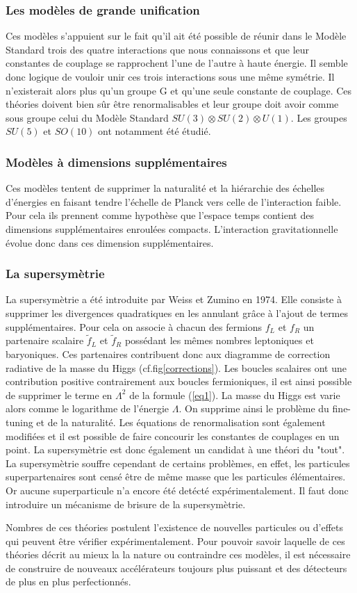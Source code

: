 \subsubsection{Les modèles de grande unification}
Ces modèles s'appuient sur le fait qu'il ait été possible de réunir dans le Modèle Standard trois des quatre interactions que nous connaissons et que leur constantes de couplage se rapprochent l'une de l'autre à haute énergie. Il semble donc logique de vouloir unir ces trois interactions sous une même symétrie. Il n'existerait alors plus qu'un groupe G et qu'une seule constante de couplage. Ces théories doivent bien sûr être renormalisables et leur groupe doit avoir comme sous groupe celui du Modèle Standard $SU(3)\otimes SU(2) \otimes U(1)$. Les groupes $SU(5)$ et $SO(10)$ ont notamment été étudié.

\subsubsection{Modèles à dimensions supplémentaires}
Ces modèles tentent de supprimer la naturalité et la hiérarchie des échelles d'énergies en faisant tendre l'échelle de Planck vers celle de l'interaction faible. Pour cela ils prennent comme hypothèse que l'espace temps contient des dimensions supplémentaires enroulées compacts. L'interaction gravitationnelle évolue donc dans ces dimension supplémentaires.

\subsubsection{La supersymètrie}
La supersymètrie a été introduite par Weiss et Zumino en 1974. Elle consiste à supprimer les divergences quadratiques  en les annulant grâce à l'ajout de termes supplémentaires. Pour cela on associe à chacun des fermions $f_{L}$ et $f_{R}$ un partenaire scalaire $\tilde{f}_{L}$ et $\tilde{f}_{R}$ possédant les mêmes nombres leptoniques et baryoniques. Ces partenaires contribuent donc aux diagramme de correction radiative de la masse du Higgs (cf.fig\ref{corrections}). Les boucles scalaires ont une contribution positive contrairement aux boucles fermioniques, il est ainsi possible de supprimer le terme en $\Lambda^2$ de la formule (\ref{eq1}). La masse du Higgs est varie alors comme le logarithme de l'énergie $\Lambda$. On supprime ainsi le problème du fine-tuning et de la naturalité. Les équations de renormalisation sont également modifiées et il est possible de faire concourir les constantes de couplages en un point. La supersymètrie est donc également un candidat à une théori du "tout". La supersymètrie souffre cependant de certains problèmes, en effet, les particules superpartenaires sont censé être de même masse que les particules élémentaires. Or aucune superparticule n'a encore été detécté expérimentalement. Il faut donc introduire un mécanisme de brisure de la supersymètrie.

Nombres de ces théories postulent l'existence de nouvelles particules ou d'effets qui peuvent être vérifier expérimentalement. Pour pouvoir savoir laquelle de ces théories décrit au mieux la la nature ou contraindre ces modèles, il est nécessaire de construire de nouveaux accélérateurs toujours plus puissant et des détecteurs de plus en plus perfectionnés. 
